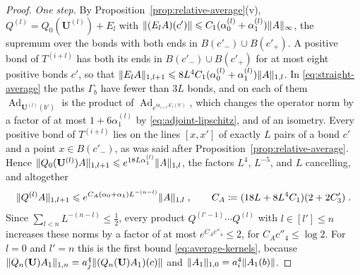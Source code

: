 \documentclass[11pt]{preprint}
\newcommand{\Ad}{\operatorname{Ad}}
\DeclarePairedDelimiter{\norm}{\lVert}{\rVert}
\numberwithin{equation}{section}
\begin{document}
\begin{proof}
\emph{One step.} By Proposition~\ref{prop:relative-average}(v), $Q^{(l)} = Q_0(\mathbf U^{(l)}) + E_l$ with $\norm{(E_lA)(c')} \leqslant C_1(\alpha_0^{(l)} + \alpha_1^{(l)})\norm A_\infty$, the supremum over the bonds with both ends in $B(c'_-) \cup B(c'_+)$. A positive bond of $T^{(i+l)}$ has both its ends in $B(c'_-) \cup B(c'_+)$ for at most eight positive bonds $c'$, so that $\norm{E_lA}_{1,l+1} \leqslant 8L^4C_1(\alpha_0^{(l)} + \alpha_1^{(l)})\norm A_{1,l}$. In \eqref{eq:straight-average} the paths $\Gamma_b$ have fewer than $3L$ bonds, and on each of them $\Ad_{\mathbf U^{(l)}(b')}$ is the product of $\Ad_{e^{ia_{i+l}A'_l(b')}}$, which changes the operator norm by a factor of at most $1 + 6\alpha_1^{(l)}$ by \eqref{eq:adjoint-lipschitz}, and of an isometry. Every positive bond of $T^{(i+l)}$ lies on the lines $[x, x']$ of exactly $L$ pairs of a bond $c'$ and a point $x \in B(c'_-)$, as was said after Proposition~\ref{prop:relative-average}. Hence $\norm{Q_0(\mathbf U^{(l)})A}_{1,l+1} \leqslant e^{18L\alpha_1^{(l)}}\norm A_{1,l}$, the factors $L^4$, $L^{-5}$, and $L$ cancelling, and altogether
\[
    \norm{Q^{(l)}A}_{1,l+1} \leqslant e^{C_A(\alpha_0 + \alpha_1)L^{-(n-l)}}\norm A_{1,l}\;,
    \qquad
    C_A \coloneqq (18L + 8L^4C_1)(2 + 2C'_3)\;.
\]
Since $\sum_{l<n}L^{-(n-l)} \leqslant \frac{1}{2}$, every product $Q^{(l'-1)}\cdots Q^{(l)}$ with $l \in [l'] \leqslant n$ increases these norms by a factor of at most $e^{C_Ac''_4} \leqslant 2$, for $C_Ac''_4 \leqslant \log 2$. For $l = 0$ and $l' = n$ this is the first bound \eqref{eq:average-kernels}, because $\norm{Q_n(\mathbf U)A_1}_{1,n} = a_j^4\norm{(Q_n(\mathbf U)A_1)(c)}$ and $\norm{A_1}_{1,0} = a_i^4\norm{A_1(b)}$.


\end{proof}
\end{document}
